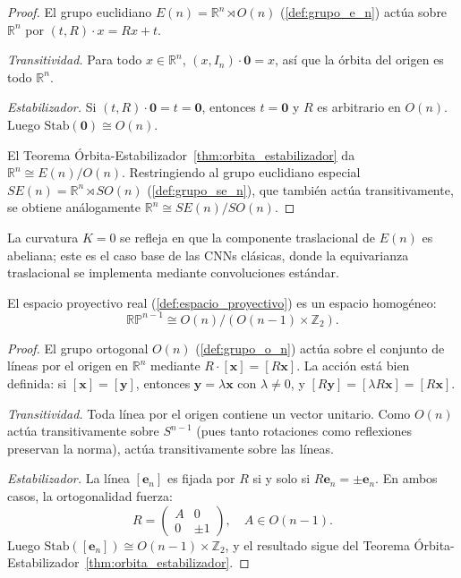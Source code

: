 \begin{proof}
El grupo euclidiano $E(n) = \mathbb{R}^n \rtimes O(n)$ (\autoref{def:grupo_e_n}) actúa sobre $\mathbb{R}^n$ por $(t, R) \cdot x = Rx + t$.

\textit{Transitividad.} Para todo $x \in \mathbb{R}^n$, $(x, I_n) \cdot \mathbf{0} = x$, así que la órbita del origen es todo $\mathbb{R}^n$.

\textit{Estabilizador.} Si $(t, R) \cdot \mathbf{0} = t = \mathbf{0}$, entonces $t = \mathbf{0}$ y $R$ es arbitrario en $O(n)$. Luego $\mathrm{Stab}(\mathbf{0}) \cong O(n)$.

El Teorema Órbita-Estabilizador~\ref{thm:orbita_estabilizador} da $\mathbb{R}^n \cong E(n)/O(n)$. Restringiendo al grupo euclidiano especial $SE(n) = \mathbb{R}^n \rtimes SO(n)$ (\autoref{def:grupo_se_n}), que también actúa transitivamente, se obtiene análogamente $\mathbb{R}^n \cong SE(n)/SO(n)$.
\end{proof}

La curvatura $K=0$ se refleja en que la componente traslacional de $E(n)$ es abeliana; este es el caso base de las \glspl{CNN} clásicas, donde la equivarianza traslacional se implementa mediante convoluciones estándar.

\begin{proposition}\label{prop:proyectivo_cociente}
El espacio proyectivo real (\autoref{def:espacio_proyectivo}) es un espacio homogéneo:
\[
\mathbb{RP}^{n-1} \cong O(n)/(O(n-1) \times \mathbb{Z}_2).
\]
\end{proposition}

\begin{proof}
El grupo ortogonal $O(n)$ (\autoref{def:grupo_o_n}) actúa sobre el conjunto de líneas por el origen en $\mathbb{R}^n$ mediante $R \cdot [\mathbf{x}] = [R\mathbf{x}]$. La acción está bien definida: si $[\mathbf{x}] = [\mathbf{y}]$, entonces $\mathbf{y} = \lambda \mathbf{x}$ con $\lambda \neq 0$, y $[R\mathbf{y}] = [\lambda R\mathbf{x}] = [R\mathbf{x}]$.

\textit{Transitividad.} Toda línea por el origen contiene un vector unitario. Como $O(n)$ actúa transitivamente sobre $S^{n-1}$ (pues tanto rotaciones como reflexiones preservan la norma), actúa transitivamente sobre las líneas.

\textit{Estabilizador.} La línea $[\mathbf{e}_n]$ es fijada por $R$ si y solo si $R\mathbf{e}_n = \pm\mathbf{e}_n$. En ambos casos, la ortogonalidad fuerza:
\[
R = \begin{pmatrix} A & 0 \\ 0 & \pm 1 \end{pmatrix}, \quad A \in O(n-1).
\]
Luego $\mathrm{Stab}([\mathbf{e}_n]) \cong O(n-1) \times \mathbb{Z}_2$, y el resultado sigue del Teorema Órbita-Estabilizador~\ref{thm:orbita_estabilizador}.
\end{proof}

